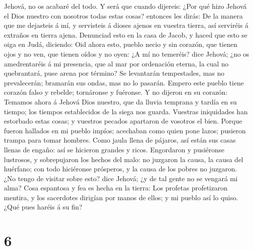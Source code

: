 Jehová, no os acabaré del todo.  Y será que cuando
dijereis: ¿Por qué hizo Jehová el Dios nuestro con nosotros todas estas
cosas? entonces les dirás: De la manera que me dejasteis á mí, y
servisteis á dioses ajenos en vuestra tierra, así serviréis á extraños
en tierra ajena.  Denunciad esto en la casa de Jacob, y
haced que esto se oiga en Judá, diciendo:  Oid ahora
esto, pueblo necio y sin corazón, que tienen ojos y no ven, que tienen
oídos y no oyen:  ¿A mí no temeréis? dice Jehová; ¿no os
amedrentaréis á mi presencia, que al mar por ordenación eterna, la cual
no quebrantará, puse arena por término? Se levantarán tempestades, mas
no prevalecerán; bramarán sus ondas, mas no lo pasarán. 
Empero este pueblo tiene corazón falso y rebelde; tornáronse y fuéronse.
 Y no dijeron en su corazón: Temamos ahora á Jehová Dios
nuestro, que da lluvia temprana y tardía en su tiempo; los tiempos
establecidos de la siega nos guarda.  Vuestras
iniquidades han estorbado estas cosas; y vuestros pecados apartaron de
vosotros el bien.  Porque fueron hallados en mi pueblo
impíos; acechaban como quien pone lazos; pusieron trampa para tomar
hombres.  Como jaula llena de pájaros, así están sus
casas llenas de engaño: así se hicieron grandes y ricos. 
Engordaron y pusiéronse lustrosos, y sobrepujaron los hechos del malo:
no juzgaron la causa, la causa del huérfano; con todo hiciéronse
prósperos, y la causa de los pobres no juzgaron.  ¿No
tengo de visitar sobre esto? dice Jehová; ¿y de tal gente no se vengará
mi alma?  Cosa espantosa y fea es hecha en la tierra:
 Los profetas profetizaron mentira, y los sacerdotes
dirigían por manos de ellos; y mi pueblo así lo quiso. ¿Qué pues haréis
á su fin?

\hypertarget{section-5}{%
\section{6}\label{section-5}}


